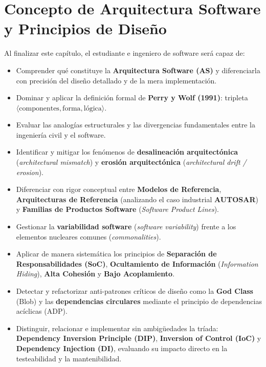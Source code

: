 \chapter{Concepto de Arquitectura Software y Principios de Diseño}
\label{cap:tema1}

\begin{tcolorbox}[
  enhanced,
  colback=primary!5!bglight,
  colframe=primary,
  arc=3mm,
  boxrule=1pt,
  title={\bfseries\color{white} Objetivos de Aprendizaje del Tema 1},
  coltitle=white
]
Al finalizar este capítulo, el estudiante e ingeniero de software será capaz de:
\begin{itemize}[leftmargin=1.5em]
  \item Comprender qué constituye la \textbf{Arquitectura Software (AS)} y diferenciarla con precisión del diseño detallado y de la mera implementación.
  \item Dominar y aplicar la definición formal de \textbf{Perry y Wolf (1991)}: tripleta $\langle \text{componentes}, \text{forma}, \text{lógica} \rangle$.
  \item Evaluar las analogías estructurales y las divergencias fundamentales entre la ingeniería civil y el software.
  \item Identificar y mitigar los fenómenos de \textbf{desalineación arquitectónica} (\emph{architectural mismatch}) y \textbf{erosión arquitectónica} (\emph{architectural drift / erosion}).
  \item Diferenciar con rigor conceptual entre \textbf{Modelos de Referencia}, \textbf{Arquitecturas de Referencia} (analizando el caso industrial \textbf{AUTOSAR}) y \textbf{Familias de Productos Software} (\emph{Software Product Lines}).
  \item Gestionar la \textbf{variabilidad software} (\emph{software variability}) frente a los elementos nucleares comunes (\emph{commonalities}).
  \item Aplicar de manera sistemática los principios de \textbf{Separación de Responsabilidades (SoC)}, \textbf{Ocultamiento de Información} (\emph{Information Hiding}), \textbf{Alta Cohesión} y \textbf{Bajo Acoplamiento}.
  \item Detectar y refactorizar anti-patrones críticos de diseño como la \textbf{God Class} (Blob) y las \textbf{dependencias circulares} mediante el principio de dependencias acíclicas (ADP).
  \item Distinguir, relacionar e implementar sin ambigüedades la tríada: \textbf{Dependency Inversion Principle (DIP)}, \textbf{Inversion of Control (IoC)} y \textbf{Dependency Injection (DI)}, evaluando su impacto directo en la testeabilidad y la mantenibilidad.
\end{itemize}
\end{tcolorbox}


